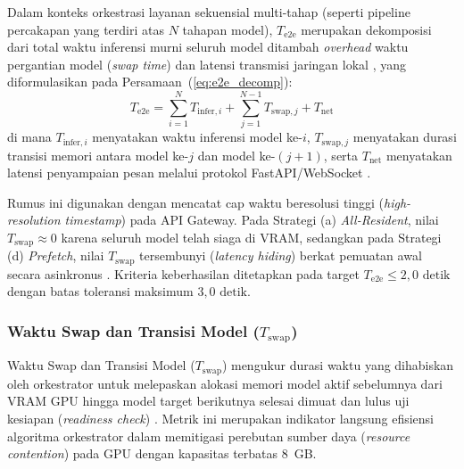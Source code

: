 Dalam konteks orkestrasi layanan sekuensial multi-tahap (seperti pipeline percakapan yang terdiri atas $N$ tahapan model), $T_{\text{e2e}}$ merupakan dekomposisi dari total waktu inferensi murni seluruh model ditambah \textit{overhead} waktu pergantian model (\textit{swap time}) dan latensi transmisi jaringan lokal \cite{zhang2025adaptive}, yang diformulasikan pada Persamaan~(\ref{eq:e2e_decomp}):
\begin{equation}
    T_{\text{e2e}} = \sum_{i=1}^{N} T_{\text{infer}, i} + \sum_{j=1}^{N-1} T_{\text{swap}, j} + T_{\text{net}}
    \label{eq:e2e_decomp}
\end{equation}
di mana $T_{\text{infer}, i}$ menyatakan waktu inferensi model ke-$i$, $T_{\text{swap}, j}$ menyatakan durasi transisi memori antara model ke-$j$ dan model ke-$(j+1)$, serta $T_{\text{net}}$ menyatakan latensi penyampaian pesan melalui protokol FastAPI/WebSocket \cite{fastapi2026}. 

Rumus ini digunakan dengan mencatat cap waktu beresolusi tinggi (\textit{high-resolution timestamp}) pada API Gateway. Pada Strategi (a) \textit{All-Resident}, nilai $T_{\text{swap}} \approx 0$ karena seluruh model telah siaga di VRAM, sedangkan pada Strategi (d) \textit{Prefetch}, nilai $T_{\text{swap}}$ tersembunyi (\textit{latency hiding}) berkat pemuatan awal secara asinkronus \cite{zhang2025adaptive}. Kriteria keberhasilan ditetapkan pada target $T_{\text{e2e}} \le 2{,}0\text{ detik}$ dengan batas toleransi maksimum $3{,}0\text{ detik}$.

\subsubsection{Waktu Swap dan Transisi Model ($T_{\text{swap}}$)}
Waktu Swap dan Transisi Model ($T_{\text{swap}}$) mengukur durasi waktu yang dihabiskan oleh orkestrator untuk melepaskan alokasi memori model aktif sebelumnya dari VRAM GPU hingga model target berikutnya selesai dimuat dan lulus uji kesiapan (\textit{readiness check}) \cite{woo2025exploring, min2023sensix}. Metrik ini merupakan indikator langsung efisiensi algoritma orkestrator dalam memitigasi perebutan sumber daya (\textit{resource contention}) pada GPU dengan kapasitas terbatas 8~GB.

